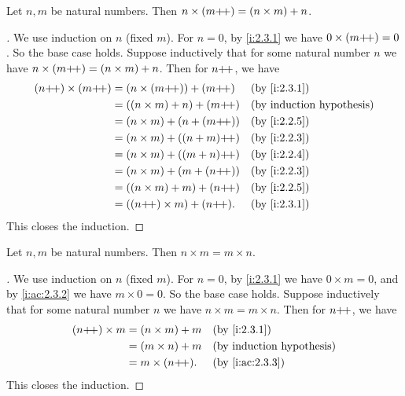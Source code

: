 \begin{ac}\label{i:ac:2.3.3}
  Let \(n, m\) be natural numbers.
  Then \(n \times (m{+}\!{+}) = (n \times m) + n\).
\end{ac}

\begin{proof}[]
  We use induction on \(n\) (fixed \(m\)).
  For \(n = 0\), by \cref{i:2.3.1} we have \(0 \times (m{+}\!{+}) = 0\).
  So the base case holds.
  Suppose inductively that for some natural number \(n\) we have \(n \times (m{+}\!{+}) = (n \times m) + n\).
  Then for \(n{+}\!{+}\), we have
  \begin{align*}
    (n\pp) \times (m\pp)
     & = (n \times (m\pp)) + (m\pp)  &  & \by{i:2.3.1} \\
     & = ((n \times m) + n) + (m\pp) &  & \byIH        \\
     & = (n \times m) + (n + (m\pp)) &  & \by{i:2.2.5} \\
     & = (n \times m) + ((n + m)\pp) &  & \by{i:2.2.3} \\
     & = (n \times m) + ((m + n)\pp) &  & \by{i:2.2.4} \\
     & = (n \times m) + (m + (n\pp)) &  & \by{i:2.2.3} \\
     & = ((n \times m) + m) + (n\pp) &  & \by{i:2.2.5} \\
     & = ((n\pp) \times m) + (n\pp). &  & \by{i:2.3.1}
  \end{align*}
  This closes the induction.
\end{proof}

\begin{lem}\label{i:2.3.2}
  Let \(n, m\) be natural numbers.
  Then \(n \times m = m \times n\).
\end{lem}

\begin{proof}[]
  We use induction on \(n\) (fixed \(m\)).
  For \(n = 0\), by \cref{i:2.3.1} we have \(0 \times m = 0\), and by \cref{i:ac:2.3.2} we have \(m \times 0 = 0\).
  So the base case holds.
  Suppose inductively that for some natural number \(n\) we have \(n \times m = m \times n\).
  Then for \(n{+}\!{+}\), we have
  \begin{align*}
    (n\pp) \times m & = (n \times m) + m &  & \by{i:2.3.1}    \\
                    & = (m \times n) + m &  & \byIH           \\
                    & = m \times (n\pp). &  & \by{i:ac:2.3.3}
  \end{align*}
  This closes the induction.
\end{proof}

